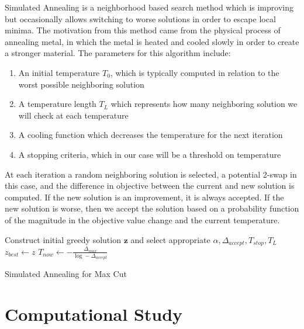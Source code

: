 \documentclass[12pt]{article}
\theoremstyle{plain}
\theoremstyle{definition}
\begin{document}
Simulated Annealing is a neighborhood based search method which is improving but occasionally allows switching to worse solutions in order to escape local minima. The motivation from this method came from the physical process of annealing metal, in which the metal is heated and cooled slowly in order to create a stronger material. The parameters for this algorithm include:

\begin{enumerate}
	\item  An initial temperature $T_0$, which is typically computed in relation to the worst possible neighboring solution
	\item A temperature length $T_L$ which represents how many neighboring solution we will check at each temperature
	\item A cooling function which decreases the temperature for the next iteration
	\item A stopping criteria, which in our case will be a threshold on temperature
\end{enumerate}

At each iteration a random neighboring solution is selected,  a potential 2-swap in this case, and the difference in objective between the current and new solution is computed. If the new solution is an improvement, it is always accepted. If the new solution is worse, then we accept the solution based on a probability function of the magnitude in the objective value change and the current temperature.

\vspace{0.25cm}

\begin{algorithm}[H]
	\SetAlgoLined
	Construct initial greedy solution $\mathbf{z}$ and select appropriate  $\alpha, \Delta_{accept}, T_{stop}, T_{L}$\;
	$z_{best} \gets z$\;
	$T_{now} \gets -\frac{\Delta_{max}}{\log -\Delta_{accept}}$\;
	\caption{Simulated Annealing for Max Cut}
\end{algorithm}

\section{Computational Study}
\end{document}
